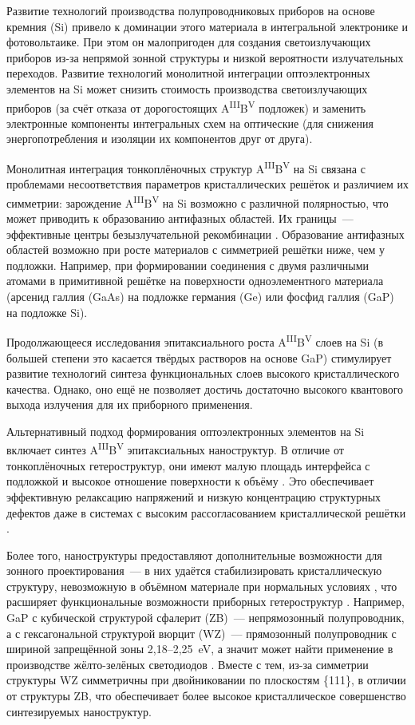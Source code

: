 
{\actuality} Развитие технологий производства полупроводниковых приборов на
основе кремния (Si) привело к  доминации этого материала в интегральной
электронике и фотовольтаике. При этом он малопригоден для создания
светоизлучающих приборов из-за непрямой зонной структуры и низкой вероятности
излучательных переходов. Развитие технологий монолитной интеграции
оптоэлектронных элементов на Si может снизить стоимость производства
светоизлучающих приборов (за счёт отказа от дорогостоящих
A\textsuperscript{III}B\textsuperscript{V} подложек) и заменить электронные
компоненты интегральных схем на оптические (для снижения энергопотребления и
изоляции их компонентов друг от друга).

Монолитная интеграция тонкоплёночных структур
A\textsuperscript{III}B\textsuperscript{V} на Si связана с проблемами
несоответствия параметров кристаллических решёток и различием их симметрии:
зарождение A\textsuperscript{III}B\textsuperscript{V} на Si возможно с
различной полярностью, что может приводить к образованию антифазных областей.
Их границы~--- эффективные центры безызлучательной рекомбинации
\cite{Takagi1998}. Образование антифазных областей возможно при росте
материалов с симметрией решётки ниже, чем у подложки. Например, при
формировании соединения с двумя различными атомами в примитивной решётке на
поверхности одноэлементного материала (арсенид галлия (GaAs) на подложке
германия (Ge) или фосфид галлия (GaP) на подложке Si).

Продолжающееся исследования эпитаксиального роста
A\textsuperscript{III}B\textsuperscript{V} слоев на Si (в большей степени это
касается твёрдых растворов на основе GaP) стимулирует развитие технологий
синтеза функциональных слоев высокого кристаллического качества. Однако, оно
ещё не позволяет достичь достаточно высокого квантового выхода излучения для их
приборного применения.

Альтернативный подход формирования оптоэлектронных элементов на Si включает
синтез A\textsuperscript{III}B\textsuperscript{V} эпитаксиальных наноструктур.
В отличие от тонкоплёночных гетероструктур, они имеют малую площадь интерфейса
с подложкой и высокое отношение поверхности к объёму \cite{Bolshakov2013,
Tchernycheva2007}. Это обеспечивает эффективную релаксацию напряжений и низкую
концентрацию структурных дефектов даже в системах с высоким рассогласованием
кристаллической решётки \cite{Samsonenko2011}.

Более того, наноструктуры предоставляют дополнительные возможности для зонного
проектирования~--- в них удаётся стабилизировать кристаллическую структуру,
невозможную в объёмном материале при нормальных условиях \cite{Mohseni2009},
что расширяет функциональные возможности приборных гетероструктур
\cite{Spirkoska2009}. Например, GaP с кубической структурой сфалерит (ZB)~---
непрямозонный полупроводник, а с гексагональной структурой вюрцит (WZ)~---
прямозонный полупроводник с шириной запрещённой зоны
2,18--2,25~\si{\electronvolt}, а значит может найти применение в производстве
жёлто-зелёных светодиодов \cite{Assali2013}. Вместе с тем, из-за симметрии
структуры WZ симметричны при двойниковании по плоскостям \{111\}, в отличии от
структуры ZB, что обеспечивает более высокое кристаллическое совершенство
синтезируемых наноструктур.

